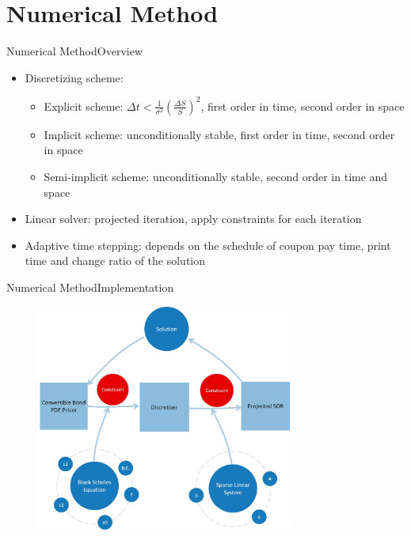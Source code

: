 \documentclass{beamer}
\begin{document}
\section{Numerical Method}

\begin{frame}{Numerical Method}{Overview}
	\begin{itemize}
		\item Discretizing scheme:
			\begin{itemize}
				\item Explicit scheme: $\Delta t < \frac{1}{\sigma^2}(\frac{\Delta S}{S})^2$, first order in time, second order in space
				\item Implicit scheme: unconditionally stable, first order in time, second order in space
				\item Semi-implicit scheme: unconditionally stable, second order in time and space
			\end{itemize}
		\item Linear solver: projected iteration, apply constraints for each iteration
		\item Adaptive time stepping: depends on the schedule of coupon pay time, print time and change ratio of the solution
	\end{itemize}
\end{frame}

\begin{frame}{Numerical Method}{Implementation}
	\begin{figure}
		\centering
		\includegraphics[width=0.75\textwidth]{Figures/Objects}
	\end{figure}
\end{frame}
\end{document}
